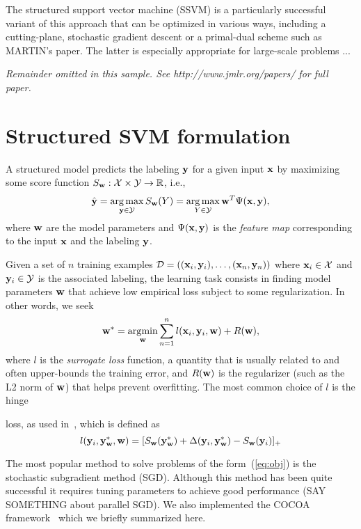 \documentclass[twoside,11pt]{article}
\newcommand{\wv}{{\bf w}}
\newcommand{\xv}{{\bf x}}
\newcommand{\yv}{{\bf y}}
\DeclareMathOperator*{\argmax}{arg\,max}
\DeclareMathOperator*{\argmin}{\arg\!\min} %
\begin{document}
The structured support vector machine (SSVM) is a particularly successful variant of this approach that can be optimized in various ways, including a cutting-plane, stochastic gradient descent or a primal-dual scheme such as MARTIN's paper. The latter is especially appropriate for large-scale problems ...

{\noindent \em Remainder omitted in this sample. See http://www.jmlr.org/papers/ for full paper.}

\section{Structured SVM formulation}

A structured model predicts the labeling $\yv$ for a given input $\xv$ by maximizing some score function
$S_\wv:\mathcal{X} \times \mathcal{Y} \rightarrow \mathbb{R}$,
i.e.,
%
\begin{equation}
\label{eq:inference}
\hat{\yv} = \argmax_{\yv \in \mathcal{Y}} S_\wv(Y) = \argmax_{Y \in \mathcal{Y}} \wv^T\Psi(\xv,\yv),
\end{equation}
%
where $\wv$ are the model parameters and $\Psi(\xv,\yv)$ is the \emph{feature map} corresponding to the input $\xv$ and the labeling $\yv$.


Given a set of $n$ training examples $\mathcal{D}=((\xv_i,\yv_i), \dots, (\xv_n, \yv_n))$ where $\xv_i \in \mathcal{X}$ and $\yv_i \in \mathcal{Y}$ is the associated labeling, 
the learning task consists in finding model parameters $\wv$ that
achieve low empirical loss subject to some regularization. In other words, we seek
%
\begin{align}
\label{eq:obj}
\wv^* = \argmin_{\wv} \sum_{n=1}^n l(\xv_i, \yv_i, \wv) + R(\wv),
\end{align}
%
where $l$ is the \emph{surrogate loss} function,
a quantity that is usually related to and often upper-bounds the training error, 
and $R(\wv)$ is the regularizer (such as the L2 norm of $\wv$)
that helps prevent overfitting. 
The most common choice of $l$ is the hinge

loss, as used in~\cite{Taskar:2003tt,Tsochantaridis:2005ww}, which is defined as
\begin{equation}
\label{eq:hinge-loss}
l(\yv_i, \yv^*_\wv, \wv) = [S_\wv(\yv^*_\wv) + \Delta(\yv_i, \yv^*_\wv) - S_\wv(\yv_i)]_+
\end{equation}


The most popular method to solve problems of the form~(\ref{eq:obj}) is the stochastic subgradient method (SGD). Although this method has been quite successful it requires tuning parameters to achieve good performance (SAY SOMETHING about parallel SGD). We also implemented the COCOA framework~\cite{Jaggi:2014vi} which we briefly summarized here.
\end{document}
